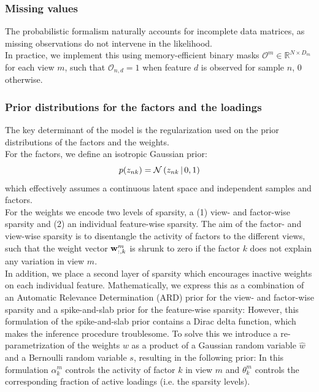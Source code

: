 \subsubsection{Missing values} \label{section:mofa_missing_values}
The probabilistic formalism naturally accounts for incomplete data matrices, as missing observations do not intervene in the likelihood.\\
In practice, we implement this using memory-efficient binary masks $\mathcal{O}^m \in \mathbb{R}^{N\times D_m}$ for each view $m$, such that $\mathcal{O}_{n,d} = 1$ when feature $d$ is observed for sample $n$, 0 otherwise. 

\subsubsection{Prior distributions for the factors and the loadings}  \label{section:mofa_loadings}
The key determinant of the model is the regularization used on the prior distributions of the factors and the weights.\\
For the factors, we define an isotropic Gaussian prior:
\begin{equation}
	p(z_{nk}) = \mathcal{N}\left(z_{nk} \,|\, 0,1\right)
\end{equation}
which effectively assumes a continuous latent space and independent samples and factors.\\
For the weights we encode two levels of sparsity, a (1) view- and factor-wise sparsity and (2) an individual feature-wise sparsity. The aim of the factor- and view-wise sparsity is to disentangle the activity of factors to the different views, such that the weight vector ${\bf w}_{:,k}^m$ is shrunk to zero if the factor $k$ does not explain any variation in view $m$. \\
In addition, we place a second layer of sparsity which encourages inactive weights on each individual feature. Mathematically, we express this as a combination of an Automatic Relevance Determination (ARD) prior \cite{Mackay1996} for the view- and factor-wise sparsity and a spike-and-slab prior \cite{Mitchell1988} for the feature-wise sparsity:
However, this formulation of the spike-and-slab prior contains a Dirac delta function, which makes the inference procedure troublesome. To solve this we introduce a re-parametrization of the weights $w$ as a product of a Gaussian random variable $\hat{w}$ and a Bernoulli random variable $s$, \cite{Titsias2011} resulting in the following prior:
In this formulation $\alpha_k^m$ controls the activity of factor $k$ in view $m$ and $\theta_k^m$ controls the corresponding fraction of active loadings (i.e. the sparsity levels).\\

